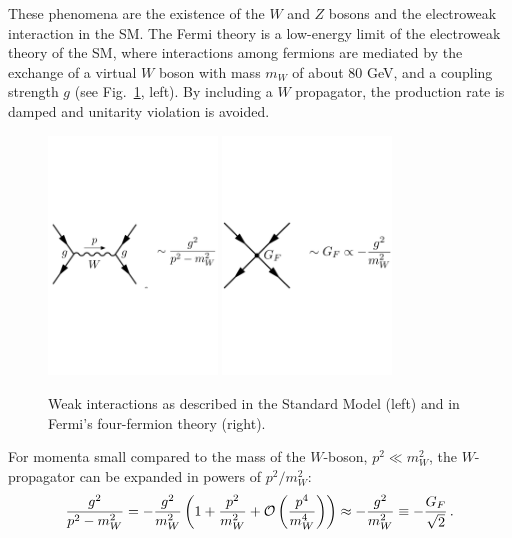 These phenomena are the existence of the $W$ and $Z$ bosons and the
electroweak interaction in the SM.
The Fermi theory is a low-energy limit of the electroweak theory of the SM, where interactions among 
fermions are mediated by the exchange of a virtual $W$ boson
with mass $m_W$ of about 80 GeV, and a 
coupling strength $g$ (see Fig.~\ref{fig:weak}, left). 
By including a $W$ propagator, the production rate is damped and unitarity violation is avoided.
\begin{figure}[htbp]
\begin{center}
\includegraphics[width=0.4\textwidth]{weak_SM}\qquad\qquad
\includegraphics[width=0.4\textwidth]{weak_Fermi}
\caption{Weak interactions as described in the Standard Model (left) and in Fermi's four-fermion theory (right).}
\label{fig:weak}
\end{center}
\end{figure}
For momenta small compared to the mass of the $W$-boson, $p^2\ll m_W^2$, the $W$-propagator can be expanded in powers of $p^2/m_W^2$:
\begin{equation}
\frac{g^2}{p^2 - m_W^2} = -\frac{g^2}{m_W^2}\left(1 + \frac{p^2}{m_W^2}+{\cal O}\left(\frac{p^4}{m_W^4}\right)\right) \approx -\frac{g^2}{m_W^2} \equiv -\frac{G_F}{\sqrt2}\,.
\label{eq:wprop}
\end{equation}

